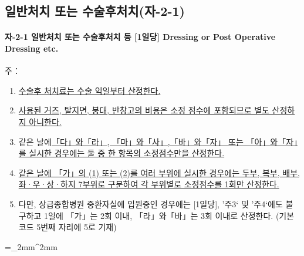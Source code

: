 \subsection{일반처치 또는 수술후처치(자-2-1)} 
\paragraph{자-2-1 일반처치 또는 수술후처치 등 [1일당] Dressing or Post Operative Dressing etc.}
주：
\begin{enumerate}[1.]\tightlist
\item \uline{수술후 처치료는 수술 익일부터 산정한다.}
\item \uline{사용된 거즈, 탈지면, 붕대, 반창고의 비용은 소정 점수에 포함되므로 별도 산정하지 아니한다.}
\item 같은 날에\uline{「다」와「라」, 「마」와「사」,「바」와「자」 또는 「아」와「자」를 실시한 경우에는 둘 중 한 항목의 소정점수만을 산정한다.}
\item \uline{같은 날에 「가」의 (1) 또는 (2)를 여러 부위에 실시한 경우에는 두부, 복부, 배부, 좌·우·상·하지 7부위로 구분하여 각 부위별로 소정점수를 1회만 산정한다.}
\item 다만, 상급종합병원 중환자실에 입원중인 경우에는 [1일당], ’주3‘ 및 ’주4‘에도 불구하고 1일에
「가」는 2회 이내, 「라」와「바」는 3회 이내로 산정한다. (기본코드 5번째 자리에 5로 기재)
\end{enumerate}
\tabulinesep =_2mm^2mm
